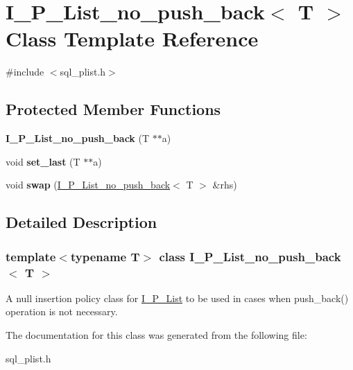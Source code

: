 \hypertarget{classI__P__List__no__push__back}{}\section{I\+\_\+\+P\+\_\+\+List\+\_\+no\+\_\+push\+\_\+back$<$ T $>$ Class Template Reference}
\label{classI__P__List__no__push__back}


{\ttfamily \#include $<$sql\+\_\+plist.\+h$>$}

\subsection*{Protected Member Functions}
\begin{DoxyCompactItemize}
\item 
\mbox{\label{classI__P__List__no__push__back_afaeda4488c2778fee18b054286bf3d29}} 
{\bfseries I\+\_\+\+P\+\_\+\+List\+\_\+no\+\_\+push\+\_\+back} (T $\ast$$\ast$a)
\item 
\mbox{\label{classI__P__List__no__push__back_a8975593a6cbf0fbd123d5d93f7a21f03}} 
void {\bfseries set\+\_\+last} (T $\ast$$\ast$a)
\item 
\mbox{\label{classI__P__List__no__push__back_a9f958e46c97c8c9a28222d2d83ac4944}} 
void {\bfseries swap} (\mbox{\hyperlink{classI__P__List__no__push__back}{I\+\_\+\+P\+\_\+\+List\+\_\+no\+\_\+push\+\_\+back}}$<$ T $>$ \&rhs)
\end{DoxyCompactItemize}


\subsection{Detailed Description}
\subsubsection*{template$<$typename T$>$\newline
class I\+\_\+\+P\+\_\+\+List\+\_\+no\+\_\+push\+\_\+back$<$ T $>$}

A null insertion policy class for \mbox{\hyperlink{classI__P__List}{I\+\_\+\+P\+\_\+\+List}} to be used in cases when push\+\_\+back() operation is not necessary. 

The documentation for this class was generated from the following file\+:\begin{DoxyCompactItemize}
\item 
sql\+\_\+plist.\+h\end{DoxyCompactItemize}
